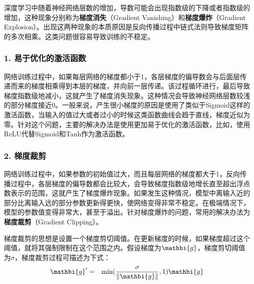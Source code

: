\parinterval  深度学习中随着神经网络层数的增加，导数可能会出现指数级的下降或者指数级的增加，这种现象分别称为{\small\sffamily\bfseries{梯度消失}}（Gradient Vanishing）和{\small\sffamily\bfseries{梯度爆炸}}（Gradient Explosion）。出现这两种现象的本质原因是反向传播过程中链式法则导致梯度矩阵的多次相乘。这类问题很容易导致训练的不稳定。


\subsubsection{1. 易于优化的激活函数}

\parinterval  网络训练过程中，如果每层网络的梯度都小于1，各层梯度的偏导数会与后面层传递而来的梯度相乘得到本层的梯度，并向前一层传递。该过程循环进行，最后导致梯度指数级地减小，这就产生了梯度消失现象。这种情况会导致神经网络层数较浅的部分梯度接近0。一般来说，产生很小梯度的原因是使用了类似于Sigmoid这样的激活函数，当输入的值过大或者过小的时候这类函数曲线会趋于直线，梯度近似为零。针对这个问题，主要的解决办法是使用更加易于优化的激活函数，比如，使用ReLU代替Sigmoid和Tanh作为激活函数。


\subsubsection{2. 梯度裁剪}

\parinterval  网络训练过程中，如果参数的初始值过大，而且每层网络的梯度都大于1，反向传播过程中，各层梯度的偏导数都会比较大，会导致梯度指数级地增长直至超出浮点数表示的范围，这就产生了梯度爆炸现象。如果发生这种情况，模型中离输入近的部分比离输入远的部分参数更新得更快，使网络变得非常不稳定。在极端情况下，模型的参数值变得非常大，甚至于溢出。针对梯度爆炸的问题，常用的解决办法为{\small\sffamily\bfseries{梯度裁剪}}（Gradient Clipping）。

\parinterval    梯度裁剪的思想是设置一个梯度剪切阈值。在更新梯度的时候，如果梯度超过这个阈值，就将其强制限制在这个范围之内。假设梯度为${\mathbi{g}}$，梯度剪切阈值为$\sigma $，梯度裁剪过程可描述为下式：
\begin{eqnarray}
{\mathbi{g}'}&=&{\textrm{min}}(\frac{\sigma}{\Vert {\mathbi{g}}\Vert},1){\mathbi{g}}
\label{eq:9-43}
\end{eqnarray}

